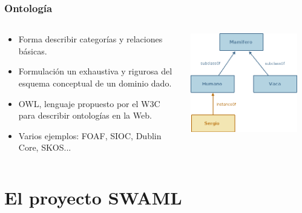 \documentclass[spanish,notes=hide]{beamer}
\begin{document}
{
  \frametitle{Ontología}

  \begin{columns}
   \begin{column}{0.55\textwidth}
	\begin{itemize}
	 \item Forma describir categorías y relaciones básicas.
	 \item Formulación un exhaustiva y rigurosa del esquema conceptual de un dominio dado.
	 \item OWL, lenguaje propuesto por el W3C para describir ontologías en la Web.
	 \item Varios ejemplos: FOAF, SIOC, Dublin Core, SKOS...
	\end{itemize}
   \end{column}
   \begin{column}{0.45\textwidth}
	\includegraphics[width=0.9\textwidth]{images/ontologia.png}
   \end{column}
  \end{columns}




}

\section{El proyecto SWAML}
\end{document}
